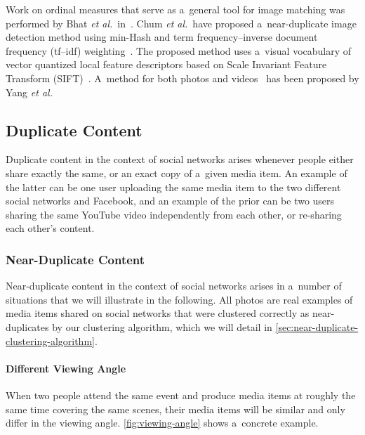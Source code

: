 Work on ordinal measures that serve as a~general tool for
image matching was performed by Bhat \emph{et al.}\
in~\cite{bhat1998imagecorrespondence}.
Chum \emph{et al.}\ have proposed a~near-duplicate image detection method
using min-Hash and term frequency--inverse document frequency (tf--idf)
weighting~\cite{chum2008nearduplicate}.
The proposed method uses a~visual vocabulary of
vector quantized local feature descriptors based on
Scale Invariant Feature Transform (SIFT)~\cite{lowe1999sift}.
A~method for both photos and videos~\cite{yang2009nearduplicate}
has been proposed by Yang \emph{et al.}

\subsection{Duplicate Content}
\label{sec:duplicate-content}

Duplicate content in the context of social networks
arises whenever people either share exactly the same,
or an exact copy of a~given media item.
An example of the latter can be one user uploading the same media item
to the two different social networks \googleplus and Facebook,
and an example of the prior can be two users sharing the same
YouTube video independently from each other, or re-sharing each other's content.

\subsubsection{Near-Duplicate Content}

Near-duplicate content in the context of social networks
arises in a~number of situations
that we will illustrate in the following.
All photos are real examples of media items shared on social networks
that were clustered correctly as near-duplicates
by our clustering algorithm, which we will detail in
\autoref{sec:near-duplicate-clustering-algorithm}.

\paragraph{Different Viewing Angle}

When two people attend the same event
and produce media items at roughly the same time
covering the same scenes,
their media items will be similar
and only differ in the viewing angle. 
\autoref{fig:viewing-angle} shows a~concrete example.

